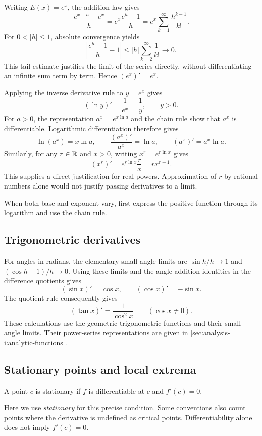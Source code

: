 \begin{example}
  Writing $E(x)=e^x$, the addition law gives
  \[
    \frac{e^{x+h}-e^x}{h}=e^x\frac{e^h-1}{h}
      =e^x\sum_{k=1}^{\infty}\frac{h^{k-1}}{k!}.
  \]
  For $0<|h|\le1$, absolute convergence yields
  \[
    \left|\frac{e^h-1}{h}-1\right|
       \le |h|\sum_{k=2}^{\infty}\frac1{k!}\longrightarrow0.
  \]
  This tail estimate justifies the limit of the series directly, without
  differentiating an infinite sum term by term.
  Hence $(e^x)'=e^x$.
\end{example}

Applying the inverse derivative rule to $y=e^x$ gives
\[
  (\ln y)'=\frac1{e^x}=\frac1y,\qquad y>0.
\]
For $a>0$, the representation $a^x=e^{x\ln a}$ and the chain rule show
that $a^x$ is differentiable. Logarithmic differentiation therefore
gives
\[
  \ln(a^x)=x\ln a,\qquad
  \frac{(a^x)'}{a^x}=\ln a,\qquad
  (a^x)'=a^x\ln a.
\]
Similarly, for any $r\in\mathbb{R}$ and $x>0$, writing $x^r=e^{r\ln x}$ gives
\[
  (x^r)'=e^{r\ln x}\frac r x=r x^{r-1}.
\]
This supplies a direct justification for real powers. Approximation of
$r$ by rational numbers alone would not justify passing derivatives to a
limit.

When both base and exponent vary, first express the
positive function through its logarithm and use the chain rule.


\subsection{Trigonometric derivatives}
For angles in radians, the elementary small-angle limits are
$\sin h/h\to1$ and $(\cos h-1)/h\to0$. Using these limits and the
angle-addition identities in the difference quotients gives
\[
  (\sin x)'=\cos x,\qquad (\cos x)'=-\sin x.
\]
The quotient rule consequently gives
\[
  (\tan x)'=\frac1{\cos^2x}\qquad(\cos x\ne0).
\]
These calculations use the geometric trigonometric functions and their
small-angle limits. Their power-series representations are given in
\autoref{sec:analysis-i:analytic-functions}.

\subsection{Stationary points and local extrema}
\begin{definition}
  \label{thm:analysis-i:stationary-point}
  A point $c$ is stationary if $f$ is differentiable at $c$ and $f'(c)=0$.
\end{definition}
Here we use \emph{stationary} for this precise condition.
Some conventions also count points where the derivative is undefined as
critical points. Differentiability alone does not imply $f'(c)=0$.

